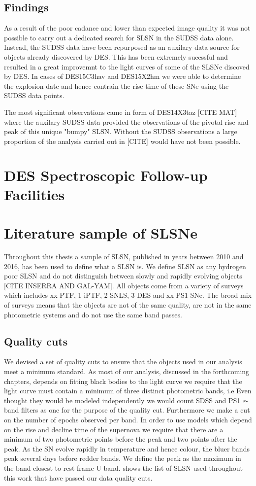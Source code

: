 \subsection{Findings}
\label{sec:SUDSSIssues}
As a result of the poor cadance and lower than expected image quality it was not possible to carry out a dedicated search for SLSN in the SUDSS data alone. Instead, the SUDSS data have been repurposed as an auxilary data source for objects already discovered by DES. This has been extremely sucessful and resulted in a great improvemnt to the light curves of some of the SLSNe discoved by DES. In cases of DES15C3hav and DES15X2hm we were able to determine the explosion date and hence contrain the rise time of these SNe using the SUDSS data points.

The most significant observations came in form of DES14X3taz [CITE MAT] where the auxilary SUDSS data provided the observations of the pivotal rise and peak of this unique "bumpy" SLSN. Without the SUDSS observations a large proportion of the analysis carried out in [CITE] would have not been possible.

\section{DES Spectroscopic Follow-up Facilities}

\section{Literature sample of SLSNe}
Throughout this thesis a sample of SLSN, published in years between 2010 and 2016, has been used to define what a SLSN is. We define SLSN as any hydrogen poor SLSN and do not distinguish between slowly and rapidly evolving objects [CITE INSERRA AND GAL-YAM]. All objects come from a variety of surveys which includes xx PTF, 1 iPTF, 2 SNLS, 3 DES and xx PS1 SNe. The broad mix of surveys means that the objects are not of the same quality, are not in the same photometric systems and do not use the same band passes.

\subsection{Quality cuts}
We devised a set of quality cuts to ensure that the objects used in our analysis meet a minimum standard. As most of our analysis, discussed in the forthcoming chapters, depends on fitting black bodies to the light curve we require that the light curve must contain a minimum of three distinct photometric bands, i.e Even thought they would be modeled independently we would count SDSS and PS1 \textit{r}-band filters as one for the purpose of the quality cut. Furthermore we make a cut on the number of epochs observed per band. In order to use models which depend on the rise and decline time of the supernova we require that there are a minimum of two photometric points before the peak and two points after the peak. As the SN evolve rapidly in temperature and hence colour, the bluer bands peak several days before redder bands. We define the peak as the maximum in the band closest to rest frame U-band.  shows the list of SLSN used throughout this work that have passed our data quality cuts.

